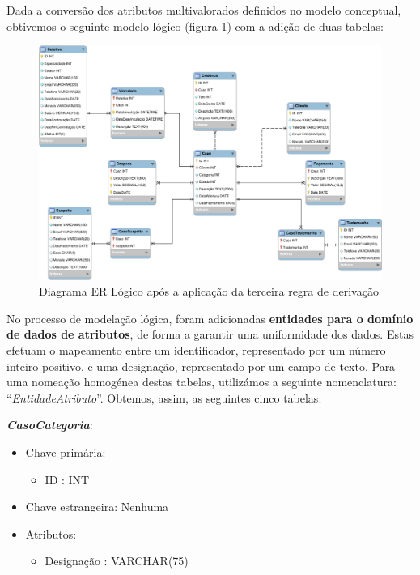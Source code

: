 \documentclass[a4paper,12pt]{scrreprt}
\begin{document}
        \vspace{0.5cm}

        Dada a conversão dos atributos multivalorados definidos no modelo conceptual, obtivemos o seguinte modelo lógico (figura \ref{fig:4.3}) com a adição de duas tabelas:

        \clearpage
        \begin{figure}[!ht]
            \centering
            \includegraphics[scale=1, angle=270]{images/modelo_logico/regra3.pdf}
            \caption{Diagrama ER Lógico após a aplicação da terceira regra de derivação}
            \label{fig:4.3}
        \end{figure}
    

        \clearpage

        No processo de modelação lógica, foram adicionadas \textbf{entidades para o domínio de dados de atributos}, de forma a garantir uma uniformidade dos dados. Estas efetuam o mapeamento entre um identificador, representado por um número inteiro positivo, e uma designação, representado por um campo de texto. Para uma nomeação homogénea destas tabelas, utilizámos a seguinte nomenclatura: “\textit{EntidadeAtributo}”. Obtemos, assim, as seguintes cinco tabelas:

        \textbf{\textit{CasoCategoria}}:
        \begin{itemize}
            \item Chave primária:
                \begin{itemize}
                    \item ID : INT
                \end{itemize}
            \item Chave estrangeira: Nenhuma
            \item Atributos:
                \begin{itemize}
                    \item Designação : VARCHAR(75)
                \end{itemize}
        \end{itemize}
\end{document}
